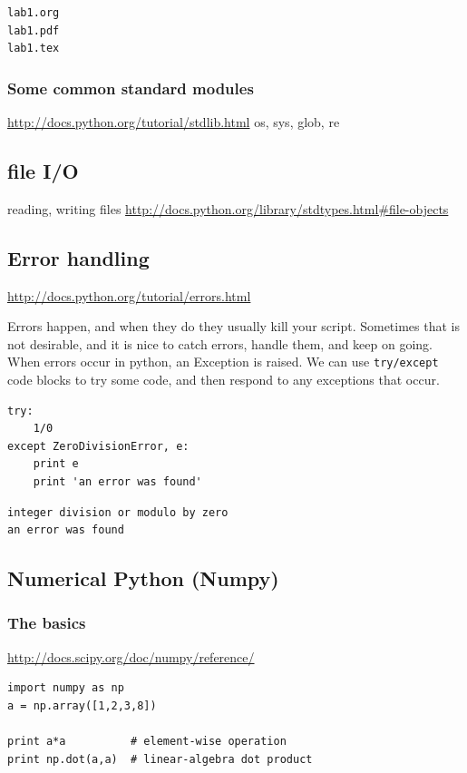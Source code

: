 \documentclass[11pt]{article}
\begin{document}
\begin{verbatim}
lab1.org
lab1.pdf
lab1.tex
\end{verbatim}

\subsubsection{Some common standard modules}
\label{sec:org6ba279e}
\url{http://docs.python.org/tutorial/stdlib.html}
os, sys, glob,  re


\subsection{file I/O}
\label{sec:orgd9d7800}
reading, writing files
\url{http://docs.python.org/library/stdtypes.html\#file-objects}


\subsection{Error handling}
\label{sec:orgaef7da1}
\url{http://docs.python.org/tutorial/errors.html}

Errors happen, and when they do they usually kill your script. Sometimes that is not desirable, and it is nice to catch errors, handle them, and keep on going. When errors occur in python, an Exception is raised. We can use \texttt{try/except} code blocks to try some code, and then respond to any exceptions that occur.

\begin{verbatim}
try:
    1/0
except ZeroDivisionError, e:
    print e
    print 'an error was found'
\end{verbatim}

\begin{verbatim}
integer division or modulo by zero
an error was found
\end{verbatim}


\subsection{Numerical Python (Numpy)}
\label{sec:org14d157f}

\subsubsection{The basics}
\label{sec:org517d732}
\url{http://docs.scipy.org/doc/numpy/reference/}

\begin{verbatim}
import numpy as np
a = np.array([1,2,3,8])

print a*a          # element-wise operation
print np.dot(a,a)  # linear-algebra dot product
\end{verbatim}
\end{document}
